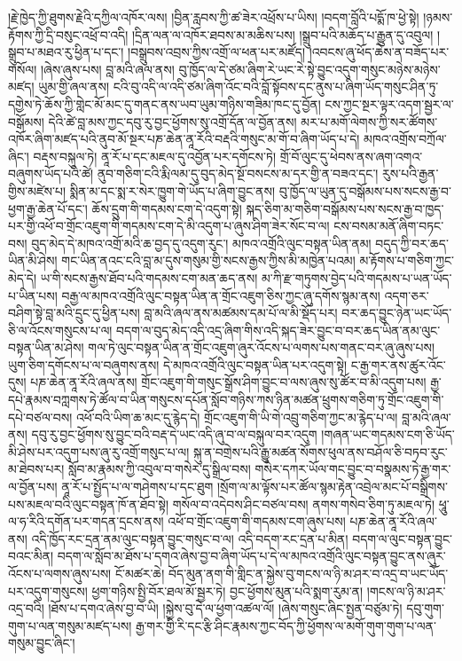 \documentclass{article}
\begin{document}
།རྗེ་ཁྱེད་ཀྱི་ཐུགས་རྗེའི་དཀྱིལ་འཁོར་ལས། །བྱིན་རླབས་ཀྱི་ཚ་ཟེར་འཕྲོས་པ་ཡིས། །བདག་བློའི་པདྨོ་ཁ་ཕྱེ་སྟེ། །ཉམས་རྟོགས་ཀྱི་དྲི་བསུང་འཕྲོ་བ་འདི། །དྲིན་ལན་ལ་འཁོར་ཐབས་མ་མཆིས་པས། །སྒྲུབ་པའི་མཆོད་པ་རྒྱུན་དུ་འབུལ། །སྒྲུབ་པ་མཐའ་རུ་ཕྱིན་པ་དང་། །བསྒྲུབས་འབྲས་ཀྱིས་འགྲོ་ལ་ཕན་པར་མཛོད། །འབངས་ཞུ་ཕོད་ཆེས་ན་བཟོད་པར་གསོལ། །ཞེས་ཞུས་པས། བླ་མའི་ཞལ་ནས། བུ་ཁྱོད་ལ་དེ་ཙམ་ཞིག་རེ་ཡང་རེ་སྟེ་བྱུང་འདུག་གསུང་མཉེས་མཉེས་མཛད། ཡུམ་གྱི་ཞལ་ནས། ངའི་བུ་འདི་ལ་འདི་ཙམ་ཞིག་འོང་བའི་བློ་སྟོབས་དང་ནུས་པ་ཞིག་ཡོད་གསུང་ཤིན་ཏུ་དགྱེས་ཏེ་ཆོས་ཀྱི་གླེང་མོ་མང་དུ་གནང་ནས་ཡབ་ཡུམ་གཉིས་གཟིམ་ཁང་དུ་བྱོན། ངས་ཀྱང་སྔར་ལྟར་འདག་སྦྱར་ལ་བསྒོམས། དེའི་ཚེ་བླ་མས་ཀྱང་དབུ་རུ་བྱང་ཕྱོགས་སུ་འགྲོ་དོན་ལ་བྱོན་ནས། མར་པ་མགོ་ལེགས་ཀྱི་སར་ཚོགས་འཁོར་ཞིག་མཛད་པའི་ནུབ་མོ་སྔར་པཎ་ཆེན་ནཱ་རོའི་བརྡའི་གསུང་མ་གོ་བ་ཞིག་ཡོད་པ་དེ། མཁའ་འགྲོས་བཀྲོལ་ཞིང་། བརྡས་བསྐུལ་ཏེ། ནཱ་རོ་པ་དང་མཇལ་དུ་འབྱོན་པར་དགོངས་ཏེ། གྲོ་བོ་ལུང་དུ་ཕེབས་ནས་ཞག་འགའ་བཞུགས་ཡོད་པའི་ཚེ། ནུབ་གཅིག་ངའི་རྨི་ལམ་དུ་བུད་མེད་སྔོ་བསངས་མ་དར་གྱི་ན་བཟའ་དང་། རུས་པའི་རྒྱན་གྱིས་མཛེས་པ། སྨིན་མ་དང་སྨ་ར་སེར་ཁྱུག་གེ་ཡོད་པ་ཞིག་བྱུང་ནས། བུ་ཁྱོད་ལ་ཡུན་དུ་བསྒོམས་པས་སངས་རྒྱ་བ་ཕྱག་རྒྱ་ཆེན་པོ་དང་། ཆོས་དྲུག་གི་གདམས་ངག་དེ་འདུག་སྟེ། སྐད་ཅིག་མ་གཅིག་བསྒོམས་པས་སངས་རྒྱ་བ་ཁྱད་པར་གྱི་འཕོ་བ་གྲོང་འཇུག་གི་གདམས་ངག་དེ་མི་འདུག་པ་ཞུས་ཤིག་ཟེར་སོང་བ་ལ། ངས་བསམ་མནོ་ཞིག་བཏང་བས། བུད་མེད་དེ་མཁའ་འགྲོ་མའི་ཆ་བྱད་དུ་འདུག་རུང་། མཁའ་འགྲོའི་ལུང་བསྟན་ཡིན་ནམ། བདུད་ཀྱི་བར་ཆད་ཡིན་མི་ཤེས། གང་ཡིན་ནའང་ངའི་བླ་མ་དུས་གསུམ་གྱི་སངས་རྒྱས་ཀྱིས་མི་མཁྱེན་པའམ། མ་རྟོགས་པ་གཅིག་ཀྱང་མེད་དེ། ཡ་གི་སངས་རྒྱས་ཐོབ་པའི་གདམས་ངག་མན་ཆད་ནས། མ་ཀི་རྫ་གཏུགས་བྱེད་པའི་གདམས་པ་ཡན་ཡོད་པ་ཡིན་པས། བརྒྱ་ལ་མཁའ་འགྲོའི་ལུང་བསྟན་ཡིན་ན་གྲོང་འཇུག་ཅིས་ཀྱང་ཞུ་དགོས་སྙམ་ནས། འདག་ཅར་བཤིག་སྟེ་བླ་མའི་དྲུང་དུ་ཕྱིན་པས། བླ་མའི་ཞལ་ནས་མཚམས་དམ་པོ་ལ་མི་སྡོད་པར། བར་ཆད་བྱུང་ཉེན་ཡང་ཡོད་ཅི་ལ་འོངས་གསུངས་པ་ལ། བདག་ལ་བུད་མེད་འདི་འདྲ་ཞིག་གིས་འདི་སྐད་ཟེར་བྱུང་བ་བར་ཆད་ཡིན་ནམ་ལུང་བསྟན་ཡིན་མ་ཤེས། གལ་ཏེ་ལུང་བསྟན་ཡིན་ན་གྲོང་འཇུག་ཞུར་འོངས་པ་ལགས་པས་གནང་བར་ཞུ་ཞུས་པས། ཡུག་ཅིག་དགོངས་པ་ལ་བཞུགས་ནས། དེ་མཁའ་འགྲོའི་ལུང་བསྟན་ཡིན་པར་འདུག་སྟེ། ང་རྒྱ་གར་ནས་ཚུར་འོང་དུས། པཎ་ཆེན་ནཱ་རོའི་ཞལ་ནས། གྲོང་འཇུག་གི་གསུང་སྒྲོས་ཤིག་བྱུང་བ་ལས་ཞུས་སུ་ཚོར་བ་མི་འདུག་པས། རྒྱ་དཔེ་རྣམས་བཀླགས་ཏེ་ཚོལ་བ་ཡིན་གསུངས་དཔོན་སློབ་གཉིས་ཀས་ཉིན་མཚན་ཕྲུགས་གཅིག་ཏུ་གྲོང་འཇུག་གི་དཔེ་བཙལ་བས། འཕོ་བའི་ཡིག་ཆ་མང་དུ་རྙེད་དེ། གྲོང་འཇུག་གི་ཡི་གེ་འབྲུ་གཅིག་ཀྱང་མ་རྙེད་པ་ལ། བླ་མའི་ཞལ་ནས། དབུ་རུ་བྱང་ཕྱོགས་སུ་བྱུང་བའི་བརྡ་དེ་ཡང་འདི་ཞུ་བ་ལ་བསྐུལ་བར་འདུག །གཞན་ཡང་གདམས་ངག་ཅི་ཡོད་མི་ཤེས་པར་འདུག་པས་ཞུ་རུ་འགྲོ་གསུང་པ་ལ། སྐུ་ན་བགྲེས་པའི་རྒྱུ་མཚན་སོགས་ཕུལ་ནས་བཤོལ་ཅི་བཏབ་རུང་མ་ཐེབས་པར། སློབ་མ་རྣམས་ཀྱི་འབུལ་བ་གསེར་དུ་སྒྲིལ་བས། གསེར་དཀར་ཡོལ་གང་བྱུང་བ་བསྣམས་ཏེ་རྒྱ་གར་ལ་བྱོན་པས། ནཱ་རོ་པ་སྤྱོད་པ་ལ་གཤེགས་པ་དང་ཐུག །སྲོག་ལ་མ་ལྟོས་པར་ཚོལ་སྙམ་རྟེན་འབྲེལ་མང་པོ་བསྒྲིགས་པས་མཇལ་བའི་ལུང་བསྟན་ཁོ་ན་ཐོབ་སྟེ། གསོལ་བ་འདེབས་ཤིང་བཙལ་བས། ནགས་གསེབ་ཅིག་ཏུ་མཇལ་ཏེ། ཕཱུ་ལ་ཧ་རིའི་དགོན་པར་གདན་དྲངས་ནས། འཕོ་བ་གྲོང་འཇུག་གི་གདམས་ངག་ཞུས་པས། པཎ་ཆེན་ནཱ་རོའི་ཞལ་ནས། འདི་ཁྱོད་རང་དྲན་ནམ་ལུང་བསྟན་བྱུང་གསུང་བ་ལ། འདི་བདག་རང་དྲན་པ་མིན། བདག་ལ་ལུང་བསྟན་བྱུང་བའང་མིན། བདག་ལ་སློབ་མ་ཐོས་པ་དགའ་ཞེས་བྱ་བ་ཞིག་ཡོད་པ་དེ་ལ་མཁའ་འགྲོའི་ལུང་བསྟན་བྱུང་ནས་ཞུར་འོངས་པ་ལགས་ཞུས་པས། ངོ་མཚར་ཆེ། བོད་མུན་ནག་གི་གླིང་ན་སྐྱེས་བུ་གངས་ལ་ཉི་མ་ཤར་བ་འདྲ་བ་ཡང་ཡོད་པར་འདུག་གསུངས། ཕྱག་གཉིས་སྤྱི་བོར་ཐལ་མོ་སྦྱར་ཏེ། བྱང་ཕྱོགས་མུན་པའི་སྨག་རུམ་ན། །གངས་ལ་ཉི་མ་ཤར་འདྲ་བའི། །ཐོས་པ་དགའ་ཞེས་བྱ་བ་ཡི། །སྐྱེས་བུ་དེ་ལ་ཕྱག་འཚལ་ལོ། །ཞེས་གསུང་ཞིང་སྤྱན་བཙུམ་ཏེ། དབུ་གུག་གུག་པ་ལན་གསུམ་མཛད་པས། རྒྱ་གར་གྱི་རི་དང་རྩི་ཤིང་རྣམས་ཀྱང་བོད་ཀྱི་ཕྱོགས་ལ་མགོ་གུག་གུག་པ་ལན་གསུམ་བྱུང་ཞིང་། 
\end{document}
